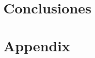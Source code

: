 \part{Conclusiones} %


\appendix

\part{Appendix} %



\cleardoublepage %

\cleardoublepage %

\cleardoublepage %



